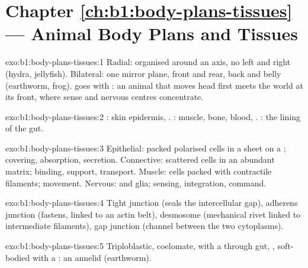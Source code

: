 \section*{Chapter \ref{ch:b1:body-plans-tissues} --- Animal Body Plans and Tissues}

\begin{solution}{exo:b1:body-plans-tissues:1}
Radial: organised around an axis, no left and right (hydra,
jellyfish). Bilateral: one mirror plane, front and rear, back and belly
(earthworm, frog).  goes with : an animal
that moves head first meets the world at its front, where sense 
and nervous centres concentrate.
\end{solution}

\begin{solution}{exo:b1:body-plans-tissues:2}
: skin epidermis, . : muscle, bone,
blood, . : the lining of the gut.
\end{solution}

\begin{solution}{exo:b1:body-plans-tissues:3}
Epithelial: packed polarised cells in a sheet on a ;
covering, absorption, secretion. Connective: scattered cells in an
abundant matrix; binding, support, transport. Muscle: cells packed with
contractile filaments; movement. Nervous:  and glia; sensing,
integration, command.
\end{solution}

\begin{solution}{exo:b1:body-plans-tissues:4}
Tight junction (seals the intercellular gap), adherens junction
(fastens, linked to an actin belt), desmosome (mechanical rivet linked
to intermediate filaments), gap junction (channel between the two
cytoplasms).
\end{solution}

\begin{solution}{exo:b1:body-plans-tissues:5}
Triploblastic, coelomate, with a through gut, , soft-bodied
with a : an annelid (earthworm).
\end{solution}

